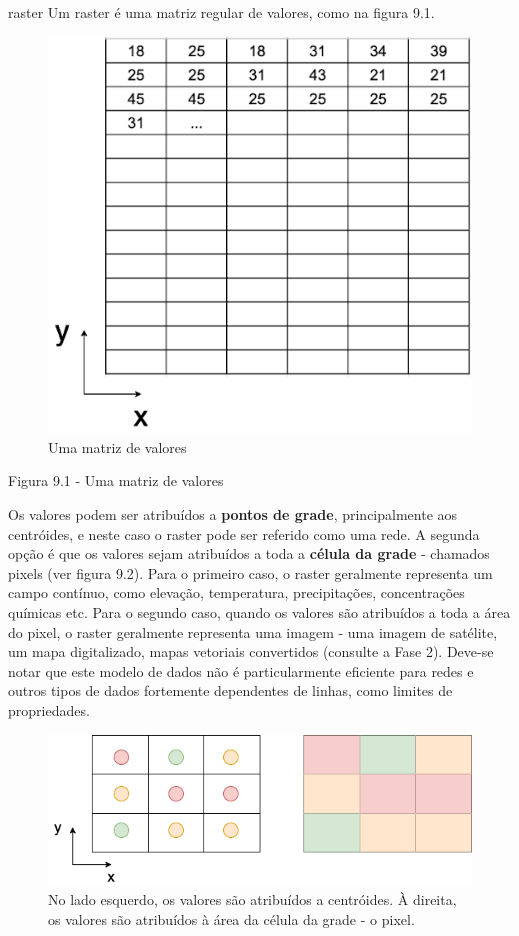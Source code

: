 \documentclass[
]{book}
\begin{document}
raster Um raster é uma matriz regular de valores, como na figura 9.1.

\begin{figure}
\centering
\includegraphics{media/modulo9/fig91.png}
\caption{Uma matriz de valores}
\end{figure}

Figura 9.1 - Uma matriz de valores

Os valores podem ser atribuídos a \textbf{pontos de grade}, principalmente aos centróides, e neste caso o raster pode ser referido como uma rede. A segunda opção é que os valores sejam atribuídos a toda a \textbf{célula da grade} - chamados pixels (ver figura 9.2). Para o primeiro caso, o raster geralmente representa um campo contínuo, como elevação, temperatura, precipitações, concentrações químicas etc. Para o segundo caso, quando os valores são atribuídos a toda a área do pixel, o raster geralmente representa uma imagem - uma imagem de satélite, um mapa digitalizado, mapas vetoriais convertidos (consulte a Fase 2). Deve-se notar que este modelo de dados não é particularmente eficiente para redes e outros tipos de dados fortemente dependentes de linhas, como limites de propriedades.

\begin{figure}
\centering
\includegraphics{media/modulo9/fig92.png}
\caption{No lado esquerdo, os valores são atribuídos a centróides. À direita, os valores são atribuídos à área da célula da grade - o pixel.}
\end{figure}
\end{document}
